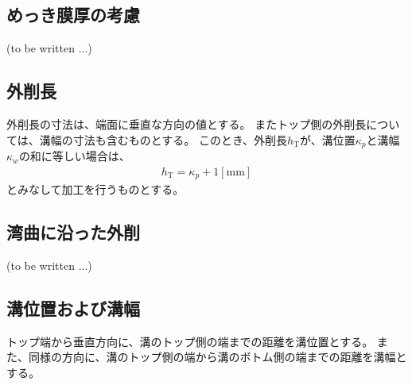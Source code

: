 \subsection{めっき膜厚の考慮\TBW}
(to be written ...)


\clearpage

\subsection{外削長}
外削長の寸法は、端面に垂直な方向の値とする。
またトップ側の外削長については、溝幅の寸法も含むものとする。
このとき、外削長$h_\mathrm T$が、溝位置$\kappa_p$と溝幅$\kappa_w$の和に等しい場合は、
\begin{align*}
  h_\mathrm T = \kappa_p+1[\text{mm}]
\end{align*}
とみなして加工を行うものとする。

\subsection{湾曲に沿った外削\TBW}
(to be written ...)



\subsection{溝位置および溝幅}
トップ端から垂直方向に、溝のトップ側の端までの距離を溝位置とする。
また、同様の方向に、溝のトップ側の端から溝のボトム側の端までの距離を溝幅とする。


